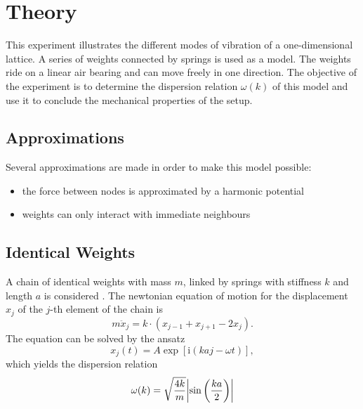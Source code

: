\chapter{Theory}
This experiment illustrates the different modes of vibration of a one-dimensional lattice.
A series of weights connected by springs is used as a model.
The weights ride on a linear air bearing and can move freely in one direction.
The objective of the experiment is to determine the dispersion relation $\omega(k)$ of this model and use it to conclude the mechanical properties of the setup.

\section{Approximations}
Several approximations are made in order to make this model possible:
\begin{itemize}
	\item the force between nodes is approximated by a harmonic potential
	\item weights can only interact with immediate neighbours
\end{itemize}

\section{Identical Weights}
A chain of identical weights with mass $m$, linked by springs with stiffness $k$ and length $a$ is considered .
The newtonian equation of motion for the displacement $x_j$ of the $j$-th element of the chain is
\begin{equation*}
	m \ddot x_j = k \cdot \left(x_{j - 1} + x_{j + 1} - 2 x_j \right).
\end{equation*}
The equation can be solved by the ansatz
\begin{equation*}
	x_j(t) = A \exp\left[\text{i} \left(k a j - \omega t\right)\right],
\end{equation*}
which yields the dispersion relation
\begin{equation}
	\omega(k) = \sqrt{\frac{4k}{m}}\abs{\sin\left(\frac{ka}{2}\right)}
\end{equation}

